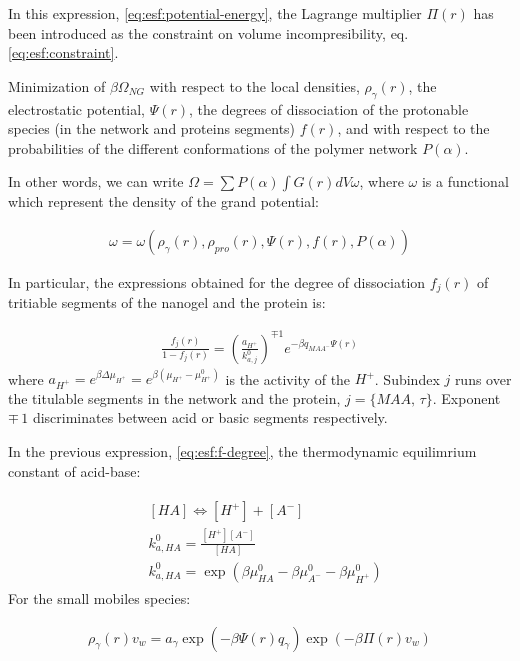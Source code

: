 In this expression, \ref{eq:esf:potential-energy}, the Lagrange multiplier $\Pi(r)$ has been introduced as  the constraint on volume incompresibility, eq. \ref{eq:esf:constraint}.


Minimization of $\beta\Omega_{NG}$ with respect to the local densities, $\rho_\gamma(r)$, the electrostatic potential, $\Psi(r)$, the degrees of dissociation of the protonable species (in the network and proteins segments) $f(r)$,  and with respect to the probabilities of the different conformations of the polymer network $P(\alpha)$.

In other words, we can write $\Omega = \sum P(\alpha) \int{G(r) dV\omega}$,  where $\omega$ is  a functional which represent the density of the grand potential: 

\begin{align}
	\omega=\omega(\rho_\gamma(r), \rho_{pro}(r),\Psi(r),f(r),P(\alpha))
\end{align}


In particular, the expressions obtained for the degree of dissociation $f_j(r)$ of tritiable segments of the nanogel and the protein is:

\begin{align}
	\frac{f_j(r)}{1-f_j(r)}= \left(\frac{a_{H^+}}{k^0_{a,j}}\right)^{\mp 1} e^{-\beta q_{MAA^-}\Psi(r)}
	\label{eq:esf:f-degree}
\end{align}
\noindent where $a_{H^+}=e^{\beta\Delta\mu_{H^+}}=e^{\beta(\mu_{H^+} -\mu^0_{H^+})}$ is the activity of the $H^+$. Subindex $j$ runs over the titulable segments in the network and the protein, $j =\{MAA , \, \tau \}$. Exponent $\mp \, 1$ discriminates between acid or basic segments respectively.

In the previous expression, \ref{eq:esf:f-degree}, the thermodynamic equilimrium  constant of  acid-base:

\begin{align}
	\begin{aligned}
		& \left[HA\right] \Longleftrightarrow [H^+] +[A^-] \\
		& k_{a,HA}^0=\frac{[H^+][A^-]}{[HA]} \\
		& k_{a,HA}^0=\exp\left(\beta\mu_{HA}^0 - \beta \mu_{A^-}^0 - \beta \mu^0_{H^+} \right)
	\end{aligned}
	\label{eq:esf:dis-rxn}
\end{align}
For the small mobiles species:

\begin{align}
	\rho_\gamma(r)v_w = a_\gamma \exp{\left(-\beta \Psi(r)q_\gamma\right)} \exp{\left(-\beta\Pi(r) v_w\right)}
\end{align}


